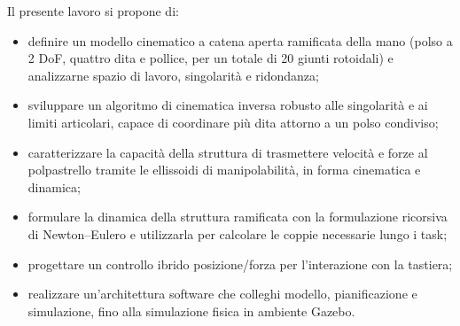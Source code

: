 Il presente lavoro si propone di:
\begin{itemize}
    \item definire un modello cinematico a catena aperta ramificata della mano (polso a 2 DoF, quattro dita e pollice, per un totale di 20 giunti rotoidali) e analizzarne spazio di lavoro, singolarità e ridondanza;
    \item sviluppare un algoritmo di cinematica inversa robusto alle singolarità e ai limiti articolari, capace di coordinare più dita attorno a un polso condiviso;
    \item caratterizzare la capacità della struttura di trasmettere velocità e forze al polpastrello tramite le ellissoidi di manipolabilità, in forma cinematica e dinamica;
    \item formulare la dinamica della struttura ramificata con la formulazione ricorsiva di Newton--Eulero e utilizzarla per calcolare le coppie necessarie lungo i task;
    \item progettare un controllo ibrido posizione/forza per l'interazione con la tastiera;
    \item realizzare un'architettura software che colleghi modello, pianificazione e simulazione, fino alla simulazione fisica in ambiente Gazebo.
\end{itemize}
